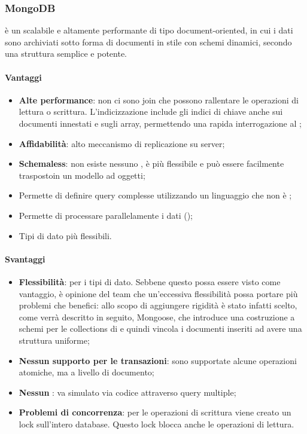 	\subsubsection{MongoDB}
\textbf{} è un    scalabile e altamente performante di tipo document-oriented, in cui i dati sono archiviati sotto forma di documenti in stile  con schemi dinamici, secondo una struttura semplice e potente. \\

\paragraph{Vantaggi}
 \begin{itemize}

\item \textbf{Alte performance}: non ci sono join che possono rallentare le operazioni di lettura o scrittura. L'indicizzazione include gli indici di chiave anche sui documenti innestati e sugli array, permettendo una rapida interrogazione al ;
\item \textbf{Affidabilità}: alto meccanismo di replicazione su server;
\item \textbf{Schemaless}: non esiste nessuno  , è più flessibile e può essere facilmente traspostoin un modello ad oggetti;
\item Permette di definire query complesse utilizzando un linguaggio che non è ;
\item Permette di processare parallelamente i dati ();
\item Tipi di dato più flessibili.
\end{itemize}  

\paragraph{Svantaggi}
\begin{itemize}
\item \textbf{Flessibilità}: per i tipi di dato. Sebbene questo possa essere visto come vantaggio,
è opinione del team che un’eccessiva flessibilità possa portare più problemi che
benefici: allo scopo di aggiungere rigidità è stato infatti scelto, come verrà descritto
in seguito, Mongoose, che introduce una costruzione a schemi per le collections di
 e quindi vincola i documenti inseriti ad avere una struttura uniforme;
\item \textbf{Nessun supporto per le transazioni}: sono supportate alcune operazioni atomiche,
ma a livello di documento;
\item \textbf{Nessun }: va simulato via codice attraverso query multiple;
\item \textbf{Problemi di concorrenza}: per le operazioni di scrittura viene creato un lock
sull’intero database. Questo lock blocca anche le operazioni di lettura.
\end{itemize}
